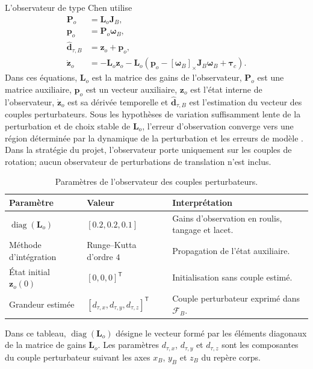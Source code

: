 \documentclass[11pt,a4paper,oneside]{report}
\newcommand{\vect}[1]{\bm{#1}}
\newcommand{\trans}{^{\mathsf T}}
\newcommand{\diag}{\operatorname{diag}}
\newcommand{\crossmat}[1]{\left[#1\right]_{\times}}
\begin{document}
L'observateur de type Chen utilise
\begin{subequations}
	\label{eq_ndo}
	\begin{align}
		\mathbf P_o&=\mathbf L_o\mathbf J_B,\\
		\vect p_o&=\mathbf P_o\vect\omega_B,\\
		\hat{\vect d}_{\tau,B}&=\vect z_o+\vect p_o,\\
		\dot{\vect z}_o&=-\mathbf L_o\vect z_o-\mathbf L_o\left(\vect p_o-\crossmat{\vect\omega_B}\mathbf J_B\vect\omega_B+\vect\tau_c\right).
	\end{align}
\end{subequations}
Dans ces équations, $\mathbf L_o$ est la matrice des gains de l'observateur, $\mathbf P_o$ est une matrice auxiliaire, $\vect p_o$ est un vecteur auxiliaire, $\vect z_o$ est l'état interne de l'observateur, $\dot{\vect z}_o$ est sa dérivée temporelle et $\hat{\vect d}_{\tau,B}$ est l'estimation du vecteur des couples perturbateurs. Sous les hypothèses de variation suffisamment lente de la perturbation et de choix stable de $\mathbf L_o$, l'erreur d'observation converge vers une région déterminée par la dynamique de la perturbation et les erreurs de modèle \cite{Chen2000}. Dans la stratégie du projet, l'observateur porte uniquement sur les couples de rotation; aucun observateur de perturbations de translation n'est inclus.

\begin{table}[H]
	\centering
	\caption{Paramètres de l'observateur des couples perturbateurs.}
	\label{tab_ndo_parameters}
	\begin{tabularx}{\textwidth}{@{}L{4.6cm}L{4.5cm}Y@{}}
		\toprule
		\textbf{Paramètre} & \textbf{Valeur} & \textbf{Interprétation}\\
		\midrule
		$\diag(\mathbf L_o)$ & $[0.2,0.2,0.1]$ & Gains d'observation en roulis, tangage et lacet.\\
		Méthode d'intégration & Runge--Kutta d'ordre $4$ & Propagation de l'état auxiliaire.\\
		État initial $\vect z_o(0)$ & $[0,0,0]\trans$ & Initialisation sans couple estimé.\\
		Grandeur estimée & $[d_{\tau,x},d_{\tau,y},d_{\tau,z}]\trans$ & Couple perturbateur exprimé dans $\mathcal F_B$.\\
		\bottomrule
	\end{tabularx}
\end{table}
Dans ce tableau, $\diag(\mathbf L_o)$ désigne le vecteur formé par les éléments diagonaux de la matrice de gains $\mathbf L_o$. Les paramètres $d_{\tau,x}$, $d_{\tau,y}$ et $d_{\tau,z}$ sont les composantes du couple perturbateur suivant les axes $x_B$, $y_B$ et $z_B$ du repère corps.
\end{document}
